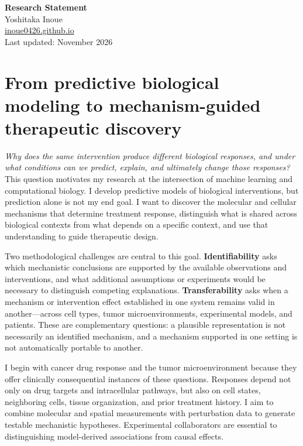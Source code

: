 \documentclass[11pt]{article}
\begin{document}
\begin{center}
{\LARGE \textbf{Research Statement}}\\[0.35em]
{\large Yoshitaka Inoue}\\[0.25em]
\href{https://inoue0426.github.io/}{inoue0426.github.io}\\[0.25em]
{\small Last updated: November 2026}
\end{center}

\vspace{0.4em}

\section*{From predictive biological modeling to mechanism-guided therapeutic discovery}

\emph{Why does the same intervention produce different biological responses, and under what conditions can we predict, explain, and ultimately change those responses?} This question motivates my research at the intersection of machine learning and computational biology. I develop predictive models of biological interventions, but prediction alone is not my end goal. I want to discover the molecular and cellular mechanisms that determine treatment response, distinguish what is shared across biological contexts from what depends on a specific context, and use that understanding to guide therapeutic design.

Two methodological challenges are central to this goal. \textbf{Identifiability} asks which mechanistic conclusions are supported by the available observations and interventions, and what additional assumptions or experiments would be necessary to distinguish competing explanations. \textbf{Transferability} asks when a mechanism or intervention effect established in one system remains valid in another---across cell types, tumor microenvironments, experimental models, and patients. These are complementary questions: a plausible representation is not necessarily an identified mechanism, and a mechanism supported in one setting is not automatically portable to another.

I begin with cancer drug response and the tumor microenvironment because they offer clinically consequential instances of these questions. Responses depend not only on drug targets and intracellular pathways, but also on cell states, neighboring cells, tissue organization, and prior treatment history. I aim to combine molecular and spatial measurements with perturbation data to generate testable mechanistic hypotheses. Experimental collaborators are essential to distinguishing model-derived associations from causal effects.
\end{document}
